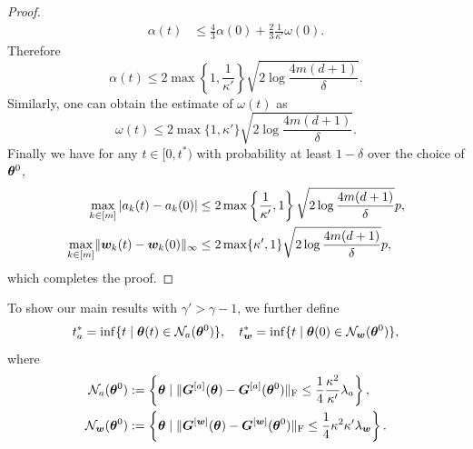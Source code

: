 \documentclass[twoside,11pt]{article}
\begin{document}
\begin{proof}
\begin{align*}
        \alpha(t) & \leq\frac{4}{3}\alpha(0)+\frac{2}{3}\frac{1}{\kappa'}\omega(0).
    \end{align*}
    Therefore
    \begin{equation*}
        \alpha(t)\leq 2\max\left\{1,\frac{1}{\kappa'}\right\}\sqrt{2\log\frac{4m(d+1)}{\delta}}.
    \end{equation*}
    Similarly, one can obtain the estimate of $\omega(t)$ as
    \begin{equation*}
        \omega(t)\leq 2\max\{1,\kappa'\}\sqrt{2\log\frac{4m(d+1)}{\delta}}.
    \end{equation*}
    Finally we have for any $t\in[0, t^*)$ with probability at least $1-\delta$ over the choice of $\bm{\theta}^0$,
    \begin{equation*}
        \begin{aligned}
            \max\limits_{k\in[m]}|a_k(t) - a_k(0)|
             & \leq 2\max\left\{\frac{1}{\kappa'},1\right\}\sqrt{2\log\frac{4m(d+1)}{\delta}}p, \\
            \max\limits_{k\in[m]}\lVert\bm{w}_k(t) - \bm{w}_k(0)\rVert_{\infty}
             & \leq 2\max\{
            \kappa',1\}\sqrt{2\log\frac{4m(d+1)}{\delta}}p,
        \end{aligned}
    \end{equation*}
    which completes the proof.
\end{proof}

To show our main results with $\gamma'>\gamma-1$, we further define
\begin{equation}
    t^*_a=\inf\{t\mid \bm{\theta}(t)\in\mathcal{N}_a(\bm{\theta}^0)\}, \quad t^*_{\bm{w}}=\inf\{t\mid \bm{\theta}(0)\in\mathcal{N}_{\bm{w}}(\bm{\theta}^0)\},
\end{equation}
where
\begin{align}
    \mathcal{N}_a(\bm{\theta}^0)     & :=\left\{\bm{\theta}\mid\lVert\bm{G}^{[a]}(\bm{\theta})-\bm{G}^{[a]}(\bm{\theta}^0)\rVert_\mathrm{F}\leq\frac{1}{4}\frac{\kappa^2}{\kappa'}\lambda_a\right\}, \\
    \mathcal{N}_{\bm{w}}(\bm{\theta}^0) & :=\left\{\bm{\theta}\mid\lVert\bm{G}^{[\bm{w}]}(\bm{\theta})-\bm{G}^{[\bm{w}]}(\bm{\theta}^0)\rVert_\mathrm{F}\leq\frac{1}{4}\kappa^2\kappa'\lambda_{\bm{w}}\right\}.
\end{align}
\end{document}
